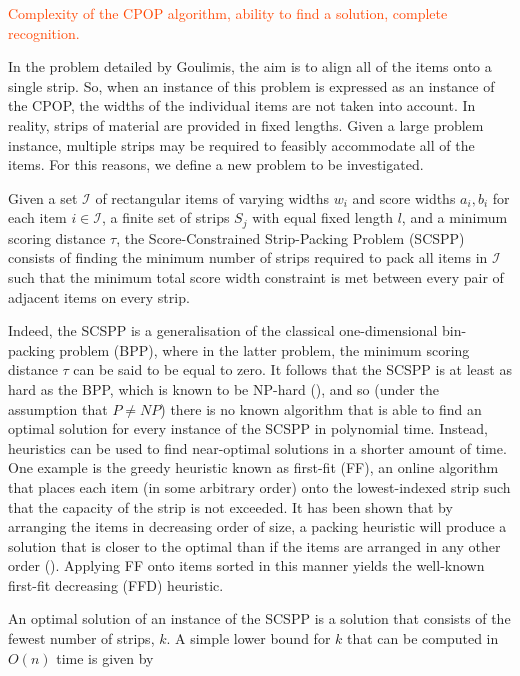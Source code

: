 \documentclass[oribibl]{llncs}
\begin{document}
\textcolor{OrangeRed}{Complexity of the CPOP algorithm, ability to find a solution, complete recognition.}


In the problem detailed by Goulimis, the aim is to align all of the items onto a single strip. So, when an instance of this problem is expressed as an instance of the CPOP, the widths of the individual items are not taken into account. In reality, strips of material are provided in fixed lengths. Given a large problem instance, multiple strips may be required to feasibly accommodate all of the items. For this reasons, we define a new problem to be investigated.

\begin{definition}
	Given a set $\mathcal{I}$ of rectangular items of varying widths $w_i$ and score widths $a_i, b_i$ for each item $i \in \mathcal{I}$, a finite set of strips $S_j$ with equal fixed length $l$, and a minimum scoring distance $\tau$, the Score-Constrained Strip-Packing Problem (SCSPP) consists of finding the minimum number of strips required to pack all items in $\mathcal{I}$ such that the minimum total score width constraint is met between every pair of adjacent items on every strip.
\end{definition}

Indeed, the SCSPP is a generalisation of the classical one-dimensional bin-packing problem (BPP), where in the latter problem, the minimum scoring distance $\tau$ can be said to be equal to zero. It follows that the SCSPP is at least as hard as the BPP, which is known to be NP-hard (\citealp{garey1979}), and so (under the assumption that $P \neq NP$) there is no known algorithm that is able to find an optimal solution for every instance of the SCSPP in polynomial time. Instead, heuristics can be used to find near-optimal solutions in a shorter amount of time. One example is the greedy heuristic known as first-fit (FF), an online algorithm that places each item (in some arbitrary order) onto the lowest-indexed strip such that the capacity of the strip is not exceeded. It has been shown that by arranging the items in decreasing order of size, a packing heuristic will produce a solution that is closer to the optimal than if the items are arranged in any other order (\citealp{johnson1974fast}). Applying FF onto items sorted in this manner yields the well-known first-fit decreasing (FFD) heuristic.

An optimal solution of an instance of the SCSPP is a solution that consists of the fewest number of strips, $k$. A simple lower bound for $k$ that can be computed in $O(n)$ time is given by
\end{document}
